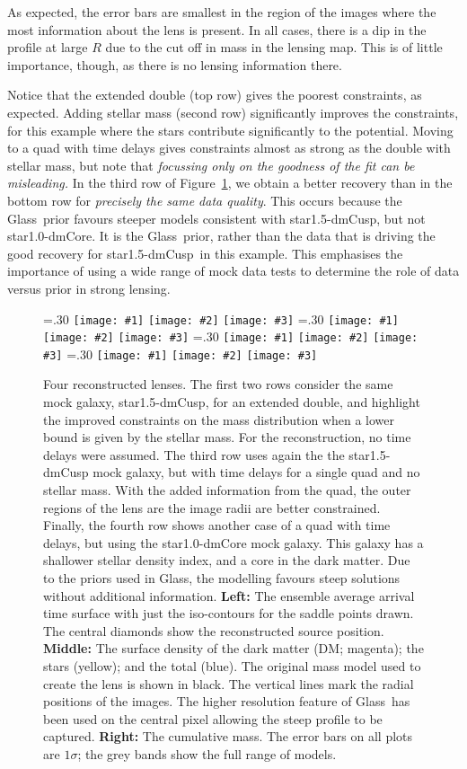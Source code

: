 \documentclass[galley,usenatbib]{mn2e}
\newcommand{\Glass}{{\sc Glass}}
\newcommand{\figref}[1] {Figure~\ref{#1}}
\newcommand{\mockAA}{{\sc star1.0-dmCore}}
\newcommand{\mockBC}{{\sc star1.5-dmCusp}}
\newcommand\plotthree[3]{{%
 \centering
 \leavevmode
 \columnwidth=.30\textwidth
 \texttt{[image: \#1]}%
 \hfil
 \texttt{[image: \#2]}%
 \hfil
 \texttt{[image: \#3]}%
}}%
\begin{document}
As expected, the error bars
are smallest in the region of the images where the most information about the
lens is present. In all cases, there is a dip in the profile at large $R$ due to the
cut off in mass in the lensing map. This is of little importance, though, as
there is no lensing information there. 

Notice that the extended double (top row) gives the poorest constraints, as expected. Adding stellar mass (second row) significantly improves the constraints, for this example where the stars contribute significantly to the potential. Moving to a quad with time delays gives constraints almost as strong as the double with stellar mass, but note that {\it focussing only on the goodness of the fit can be misleading.} In the third row of \figref{reconstruction}, we obtain a better recovery than in the bottom row for {\it precisely the same data quality}. This occurs because the \Glass\ prior favours steeper models consistent with \mockBC, but not \mockAA. It is the \Glass\ prior, rather than the data that is driving the good recovery for \mockBC\ in this example. This emphasises the importance of using a wide range of mock data tests to determine the role of data versus prior in strong lensing.

\begin{figure}
  \plotthree{BCExtendedDoubleR1_tms-a.pdf} {BCExtendedDoubleR1_tms-b.pdf} {BCExtendedDoubleR1_tms-c.pdf}
  \plotthree{BCExtendedDoubleR1_tmS-a-1.pdf} {BCExtendedDoubleR1_tmS-b-1.pdf} {BCExtendedDoubleR1_tmS-c-1.pdf}
  \plotthree{BCQuadR1a_Tms-a.pdf} {BCQuadR1a_Tms-b.pdf} {BCQuadR1a_Tms-c.pdf}
  \plotthree{AAQuadR1a_Tms-a.pdf} {AAQuadR1a_Tms-b.pdf} {AAQuadR1a_Tms-c.pdf}
\caption{
    Four reconstructed lenses. The first two rows consider the same mock
    galaxy, \mockBC, for an extended double, and highlight the improved
    constraints on the mass distribution when a lower bound is given by the
    stellar mass. For the reconstruction, no time delays were assumed.  The
    third row uses again the the \mockBC{} mock galaxy, but with time delays
    for a single quad and no stellar mass. With the added information from the
    quad, the outer regions of the lens are the image radii are better
    constrained. Finally, the fourth row shows another case of a quad with time
    delays, but using the \mockAA{} mock galaxy. This galaxy has a shallower
    stellar density index, and a core in the dark matter. Due to the priors
    used in \Glass, the modelling favours steep solutions without additional
    information.
\textbf{Left:}
The ensemble average arrival time surface with just the iso-contours for the
saddle points drawn. The central diamonds show the reconstructed source
position.
\textbf{Middle:}
The surface density of the dark matter (DM; magenta); the stars (yellow); and the total (blue).
The original mass model used to create the lens is shown in black.
The vertical lines mark the radial positions of the images. The higher
resolution feature of \Glass\ has been used on the central pixel allowing the
steep profile to be captured.
\textbf{Right:}
The cumulative mass. The error bars on all plots are $1\sigma$; the grey bands show the full range of models.}
\label{reconstruction}
\end{figure}
\end{document}
